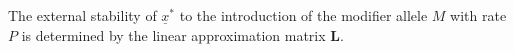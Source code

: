 \documentclass[9pt,twocolumn,twoside,lineno]{pnas-new}
\newcommand{\cl}{\mathbf{L}}
\begin{document}
 The external stability of $\underline x^*$ to the introduction of the modifier allele $M$ with rate $P$ is determined by the linear approximation matrix $\cl$.
\end{document}
